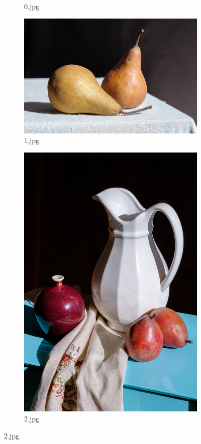 \begin{figure}[htb]
\begin{subfigure}{0.25\textwidth}
  \caption*{0.jpg}
  \label{fig:0jpg}
\end{subfigure}\hfil %
\begin{subfigure}{0.25\textwidth}
  \includegraphics[width=\linewidth]{../images/1.jpg}
  \caption*{1.jpg}
  \label{fig:1jpg}
\end{subfigure}\hfil %
\begin{subfigure}{0.25\textwidth}
  \includegraphics[width=\linewidth]{../images/2.jpg}
  \caption*{2.jpg}
  \label{fig:2jpg}
\end{subfigure}


\end{figure}
